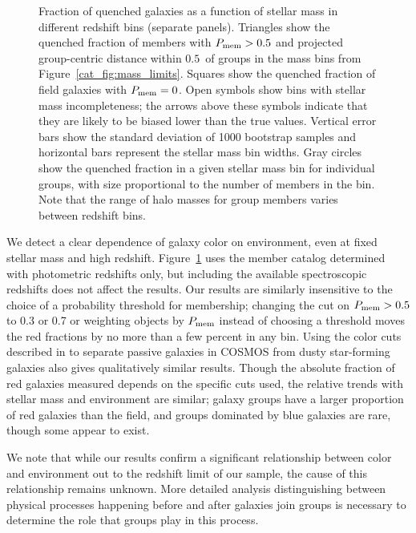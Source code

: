 \begin{figure}
\caption{Fraction of quenched galaxies as a function of stellar mass
  in different redshift bins (separate panels). Triangles show the
  quenched fraction of members with $P_{\rm mem}>0.5$ and
  projected group-centric distance within $0.5$\rvir\ of groups in the
  mass bins from Figure~\ref{cat_fig:mass_limits}. Squares show the
  quenched fraction of field galaxies with $P_{\rm mem}=0$. Open
  symbols show bins with stellar mass incompleteness; the arrows above
  these symbols indicate that they are likely to be biased lower than
  the true values. Vertical error bars show the standard deviation of 1000
  bootstrap samples and horizontal bars represent the stellar mass bin widths. Gray circles
  show the quenched fraction in a given stellar mass bin for
  individual groups, with size proportional to the number of members
  in the bin. Note that the range of halo masses for group members
  varies between redshift bins.}
\label{cat_fig:quenchz}
\end{figure}
 
We detect a clear dependence of galaxy color on environment, even at fixed
stellar mass and high redshift. Figure~\ref{cat_fig:quenchz} uses the
member catalog determined with photometric redshifts only, but
including the available spectroscopic redshifts does not affect the
results. Our results are similarly insensitive to the choice of a
probability threshold for membership; changing the cut on $P_{\rm
  mem}>0.5$ to 0.3 or 0.7 or weighting objects by $P_{\rm mem}$ instead
of choosing a threshold moves the red fractions by no more than a
few percent in any bin. Using the color
cuts described in \citet{Bundy2010} to separate passive galaxies in
COSMOS from dusty star-forming galaxies also gives qualitatively similar
results. Though the absolute fraction of red galaxies measured depends
on the specific cuts used, the relative trends with stellar mass and
environment are similar; galaxy groups have a larger proportion of red
galaxies than the field, and groups dominated by blue galaxies are
rare, though some appear to exist. 

We note that while our results confirm a significant relationship
between color and environment out to the redshift limit of our sample,
the cause of this relationship remains unknown. More detailed analysis
distinguishing between physical processes happening before and after
galaxies join groups is necessary to determine the role that groups
play in this process.

